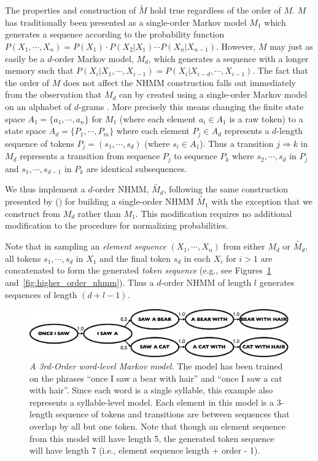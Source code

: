 \documentclass[phd,electronic,oneside,twosidetoc,letterpaper,chaptercenter,parttop,lol,lof,lot]{byumsphd}
\begin{document}
The properties and construction of $\tilde{M}$  hold true regardless of the order of $M$. $M$ has traditionally been presented as a single-order Markov model $M_1$ which generates a sequence according to the probability function $P(X_1,\cdots,X_n) = P(X_1)\cdot P(X_2|X_1)\cdots P(X_n|X_{n-1})$. However, $M$ may just as easily be a $d$-order Markov model, $M_d$, which generates a sequence with a longer memory such that $P(X_i|X_1,\cdots,X_{i-1}) = P(X_i|X_{i-d},\cdots,X_{i-1})$. The fact that the order of $M$ does not affect the NHMM construction falls out immediately from the observation that $M_d$ can by created using a single-order Markov model on an alphabet of $d$-grams \cite{papadopoulos2015exact}. More precisely this means changing the finite state space ${A_1} = \{a_1, \cdots,a_n\}$ for $M_1$ (where each element $a_i \in A_1$ is a raw token) to a state space $A_d = \{P_1,\cdots,P_m\}$ where each element $P_j \in {A_d}$ represents a $d$-length sequence of tokens $P_j = (s_1, \cdots, s_d)$ (where $s_i \in {A_1}$). Thus a transition $j\Rightarrow k$ in ${M_d}$ represents a transition from sequence $P_j$ to sequence $P_k$ where $s_2, \cdots, s_d$ in $P_j$ and $s_1, \cdots, s_{d-1}$ in $P_k$ are identical subsequences. 

We thus implement a $d$-order NHMM, $\tilde{M_d}$, following the same construction presented by \citeauthor{pachet2011finite} (\citeyear{pachet2011finite}) for building a single-order NHMM $\tilde{M_1}$ with the exception that we construct from $M_d$ rather than $M_1$. This modification requires no additional modification to the procedure for normalizing probabilities. 

Note that in sampling an \textit{element sequence} $(X_1,\cdots,X_n)$ from either $M_d$ or $\tilde{M_d}$, all tokens $s_1, \cdots, s_d$ in $X_1$ and the final token $s_d$ in each $X_i$ for $i>1$ are concatenated to form the generated \textit{token sequence} (e.g., see Figures~\ref{fig:higher_order_markov} and~\ref{fig:higher_order_nhmm}). Thus a $d$-order NHMM of length $l$ generates sequences of length $(d+l-1)$.

\begin{figure} 
\centering
\includegraphics[width=\linewidth]{higher_order_mm}
\caption{\textit{A 3rd-Order word-level Markov model.} The model has been trained on the phrases ``once I saw a bear with hair'' and ``once I saw a cat with hair''. Since each word is a single syllable, this example also represents a syllable-level model. Each element in this model is a 3-length sequence of tokens and transitions are between sequences that overlap by all but one token. Note that though an element sequence from this model will have length 5, the generated token sequence will have length 7 (i.e., element sequence length + order - 1).}
\label{fig:higher_order_markov}
\end{figure}
\end{document}

